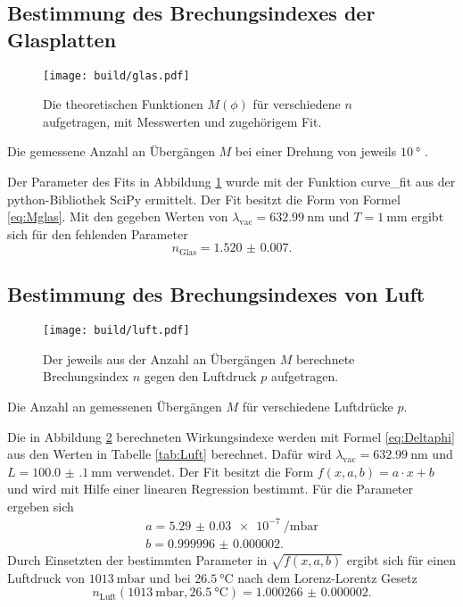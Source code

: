 \subsection{Bestimmung des Brechungsindexes der Glasplatten}
\label{ssec:glas}
\begin{figure}
	\centering
	\texttt{[image: build/glas.pdf]}
	\caption{Die theoretischen Funktionen $M(\phi)$ für verschiedene $n$ aufgetragen, mit Messwerten und zugehörigem Fit.}
	\label{fig:Glas}
\end{figure}
\begin{table}
	\centering
	\caption{Die gemessene Anzahl an Übergängen $M$ bei einer Drehung von jeweils $\SI{10}{\degree}$ .}
	
\end{table}
Der Parameter des Fits in Abbildung \ref{fig:Glas} wurde mit der Funktion curve\_fit aus der python-Bibliothek SciPy \cite{scipy} ermittelt. Der Fit besitzt die Form von Formel \eqref{eq:Mglas}. Mit den gegeben Werten von $\lambda_\text{vac}=\SI{632.99}{\nano\meter}$ und $T=\SI{1}{\milli\meter}$ ergibt sich für den fehlenden Parameter
\begin{displaymath}
	n_\text{Glas}=\num{1.520(7)}.
\end{displaymath}

\subsection{Bestimmung des Brechungsindexes von Luft}
\label{ssec:luft}
\begin{figure}
	\centering
	\texttt{[image: build/luft.pdf]}
	\caption{Der jeweils aus der Anzahl an Übergängen $M$ berechnete Brechungsindex $n$ gegen den Luftdruck $p$ aufgetragen.}
	\label{fig:Luft}
\end{figure}
\begin{table}
	\centering
	\caption{Die Anzahl an gemessenen Übergängen $M$ für verschiedene Luftdrücke $p$.}
	
\end{table}
Die in Abbildung \ref{fig:Luft} berechneten Wirkungsindexe werden mit Formel \eqref{eq:Deltaphi} aus den Werten in Tabelle \ref{tab:Luft} berechnet. Dafür wird $\lambda_\text{vac}=\SI{632.99}{\nano\meter}$ und $L=\SI{100.0(1)}{\milli\meter}$ verwendet. Der Fit besitzt die Form $f(x,a,b) =a\cdot x +b$ und wird mit Hilfe einer linearen Regression bestimmt. Für die Parameter ergeben sich
\begin{gather*}
	a=\SI{5.29(3)e-7}{\per\milli\bar}\\
	b=\num{0.999996(2)}.
\end{gather*}
Durch Einsetzten der bestimmten Parameter in $\sqrt{f(x,a,b)}$ ergibt sich für einen Luftdruck von $\SI{1013}{\milli\bar}$ und bei $\SI{26.5}{\degreeCelsius}$ nach dem Lorenz-Lorentz Gesetz
\begin{displaymath}
 n_\text{Luft}(\SI{1013}{\milli\bar},\SI{26.5}{\degreeCelsius})=\num{1.000266(2)}.
\end{displaymath}